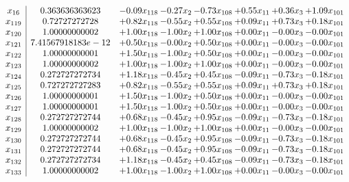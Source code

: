 \documentclass[8pt]{article}
\begin{document}
\[\begin{array}{c| c c@{\hskip 2pt} c@{\hskip 2pt} c@{\hskip 2pt} c@{\hskip 2pt} c@{\hskip 2pt} c@{\hskip 2pt} }
 x_{16}   &  0.363636363623 & -0.09 x_{118} & -0.27 x_{2} & -0.73 x_{108} & +  0.55 x_{11} & +  0.36 x_{3} & +  1.09 x_{101}\\
 x_{119}   &  0.72727272728 & +  0.82 x_{118} & -0.55 x_{2} & +  0.55 x_{108} & +  0.09 x_{11} & +  0.73 x_{3} & +  0.18 x_{101}\\
 x_{120}   &  1.00000000002 & +  1.00 x_{118} & -1.00 x_{2} & +  1.00 x_{108} & +  0.00 x_{11} & -0.00 x_{3} & -0.00 x_{101}\\
 x_{121}   &  7.41567918183e-12 & +  0.50 x_{118} & -0.00 x_{2} & +  0.50 x_{108} & +  0.00 x_{11} & -0.00 x_{3} & -0.00 x_{101}\\
 x_{122}   &  1.00000000001 & +  1.50 x_{118} & -1.00 x_{2} & +  0.50 x_{108} & +  0.00 x_{11} & -0.00 x_{3} & -0.00 x_{101}\\
 x_{123}   &  1.00000000002 & +  1.00 x_{118} & -1.00 x_{2} & +  1.00 x_{108} & +  0.00 x_{11} & -0.00 x_{3} & -0.00 x_{101}\\
 x_{124}   &  0.272727272734 & +  1.18 x_{118} & -0.45 x_{2} & +  0.45 x_{108} & -0.09 x_{11} & -0.73 x_{3} & -0.18 x_{101}\\
 x_{125}   &  0.727272727283 & +  0.82 x_{118} & -0.55 x_{2} & +  0.55 x_{108} & +  0.09 x_{11} & +  0.73 x_{3} & +  0.18 x_{101}\\
 x_{126}   &  1.00000000001 & +  1.50 x_{118} & -1.00 x_{2} & +  0.50 x_{108} & +  0.00 x_{11} & -0.00 x_{3} & -0.00 x_{101}\\
 x_{127}   &  1.00000000001 & +  1.50 x_{118} & -1.00 x_{2} & +  0.50 x_{108} & +  0.00 x_{11} & -0.00 x_{3} & -0.00 x_{101}\\
 x_{128}   &  0.272727272744 & +  0.68 x_{118} & -0.45 x_{2} & +  0.95 x_{108} & -0.09 x_{11} & -0.73 x_{3} & -0.18 x_{101}\\
 x_{129}   &  1.00000000002 & +  1.00 x_{118} & -1.00 x_{2} & +  1.00 x_{108} & +  0.00 x_{11} & -0.00 x_{3} & -0.00 x_{101}\\
 x_{130}   &  0.272727272744 & +  0.68 x_{118} & -0.45 x_{2} & +  0.95 x_{108} & -0.09 x_{11} & -0.73 x_{3} & -0.18 x_{101}\\
 x_{131}   &  0.272727272744 & +  0.68 x_{118} & -0.45 x_{2} & +  0.95 x_{108} & -0.09 x_{11} & -0.73 x_{3} & -0.18 x_{101}\\
 x_{132}   &  0.272727272734 & +  1.18 x_{118} & -0.45 x_{2} & +  0.45 x_{108} & -0.09 x_{11} & -0.73 x_{3} & -0.18 x_{101}\\
 x_{133}   &  1.00000000002 & +  1.00 x_{118} & -1.00 x_{2} & +  1.00 x_{108} & +  0.00 x_{11} & -0.00 x_{3} & -0.00 x_{101}\\

\end{array}\]
\end{document}
